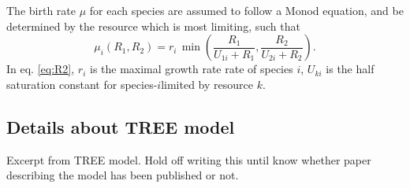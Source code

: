 \documentclass[a4paper,11pt]{article}
\begin{document}
The birth rate $\mu$ for each species are assumed to follow a Monod equation,
and be determined by the resource which is most limiting, such that
\begin{equation}
\label{eq:R2}
\mu_i(R_1, R_2) = r_i \, \min \left(\frac{R_1}{U_{1i} + R_1},
                                    \frac{R_2}{U_{2i} + R_2} \right).
\end{equation}
In eq. \ref{eq:R2}, $r_i$ is the maximal growth rate rate of species $i$, $U_
{ki}$ is the half saturation constant for species-$i$limited by resource $k$.

\subsection{Details about TREE model}\label{TREE}

Excerpt from  TREE model. Hold off writing this until know whether paper describing
the model has been published or not.
\end{document}
